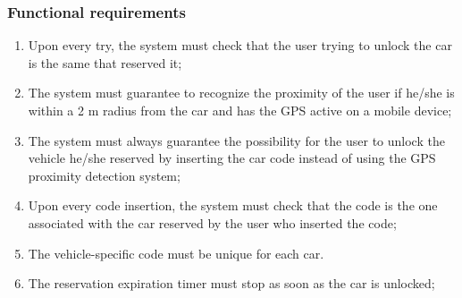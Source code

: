 \subsubsection{Functional requirements}
\begin{enumerate}
\item Upon every try, the system must check that the user trying to unlock the car is the same that reserved it;
\item The system must guarantee to recognize the proximity of the user if he/she is within a 2 m radius from the car and has the GPS active on a mobile device;
\item The system must always guarantee the possibility for the user to unlock the vehicle he/she reserved by inserting the car code instead of using the GPS proximity detection system;
\item Upon every code insertion, the system must check that the code is the one associated with the car reserved by the user who inserted the code;
\item The vehicle-specific code must be unique for each car.
\item The reservation expiration timer must stop as soon as the car is unlocked;
\end{enumerate}

